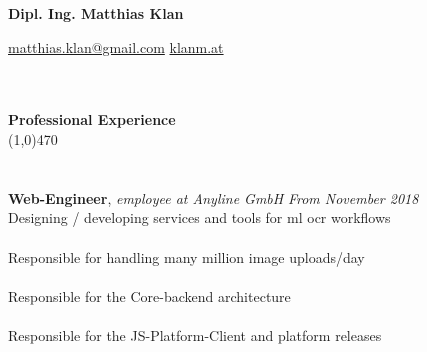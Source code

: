 \documentclass[10pt]{article} %
\begin{document}
\centerline{{\LARGE \bf Dipl. Ing. Matthias Klan}}
\centerline{\href{mailto:matthias.klan@gmail.com}{matthias.klan@gmail.com} \raisebox{0.25ex}{\tiny$\bullet$} \href{https://klanm.at}{klanm.at}}

\noindent %
\\\\
{\Large \bf Professional Experience}\\
\line(1,0){470}\\
\\\\
\noindent
{\bf Web-Engineer}, \textit{employee at Anyline GmbH}  \hfill \textit{ From November 2018 } \\ 
Designing / developing services and tools for ml ocr workflows   \\\\
Responsible for handling many million image uploads/day   \\\\
Responsible for the Core-backend architecture   \\\\
Responsible for the JS-Platform-Client and platform releases   \\\\
\end{document}
